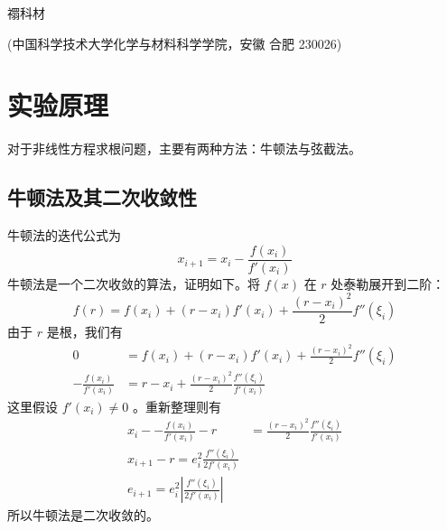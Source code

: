 \documentclass[12pt]{ctexart}
\numberwithin{equation}{section}
\begin{document}
\nocite{*}

\begin{center}
    \heiti {}

    \vspace{12pt}

    \kaishu \fontsize{13.75pt}{0}禤科材
    


    \vspace{5pt}

    \songti \fontsize{12pt}{0}(中国科学技术大学化学与材料科学学院，安徽 合肥 230026)
\end{center}


\section{实验原理}

对于非线性方程求根问题，主要有两种方法：牛顿法与弦截法。

\subsection{牛顿法及其二次收敛性}
牛顿法的迭代公式为
\begin{equation}\label{equ:newton}
    x_{i+1} = x_i - \frac{f(x_i)}{f'(x_i)} 
\end{equation}
牛顿法是一个二次收敛的算法，证明如下。将 $f(x)$ 在 $r$ 处泰勒展开到二阶：
\[
    f(r) = f(x_i) + (r - x_i) f'(x_i) + \frac{(r - x_i)^2}{2} f''(\xi_i)
\]
由于 $r$ 是根，我们有
\begin{align*}
    0 &= f(x_i) + (r - x_i) f'(x_i) + \frac{(r - x_i)^2}{2} f''(\xi_i) \\
    - \frac{f(x_i)}{f'(x_i)}  &= r - x_i + \frac{(r - x_i)^2}{2} \frac{f''(\xi_i)}{f'(x_i)}  
\end{align*}
这里假设 $f'(x_i) \neq 0$ 。重新整理则有
\begin{align*}
    x_i - - \frac{f(x_i)}{f'(x_i)} - r &= \frac{(r - x_i)^2}{2} \frac{f''(\xi_i)}{f'(x_i)}  \\
    x_{i+1} - r = e_i^2 \frac{f''(\xi_i)}{2f'(x_i)}  \\
    e_{i+1} = e_i^2 \left|\frac{f''(\xi_i)}{2f'(x_i)} \right| 
\end{align*}
所以牛顿法是二次收敛的。
\end{document}
